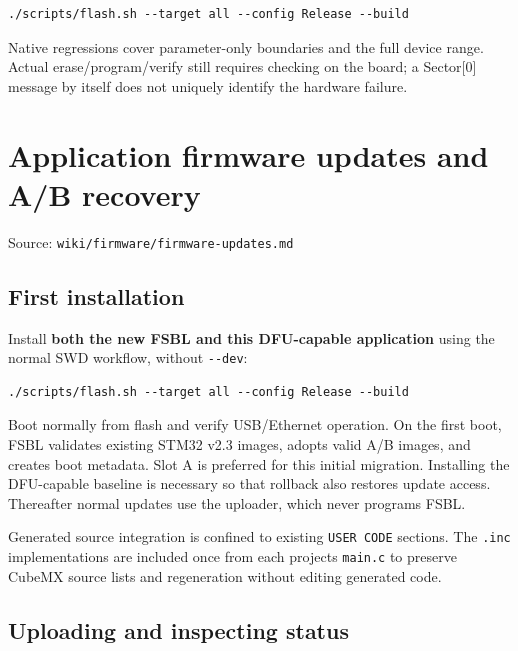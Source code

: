 \documentclass[10pt,a4paper,oneside]{report}
\begin{document}
\begin{verbatim}
./scripts/flash.sh --target all --config Release --build
\end{verbatim}

Native regressions cover parameter-only boundaries and the full device range. Actual erase/program/verify still requires checking on the board; a Sector{[}0{]} message by itself does not uniquely identify the hardware failure.

\chapter{Application firmware updates and A/B recovery}\label{wiki-firmware-firmware-updates--application-firmware-updates-and-ab-recovery}

{\small\color{MGSMuted}Source: \nolinkurl{wiki/firmware/firmware-updates.md}\par}\medskip

\section{First installation}\label{wiki-firmware-firmware-updates--first-installation}

Install \textbf{both the new FSBL and this DFU-capable application} using the normal SWD workflow, without \texttt{-\allowbreak{}-\allowbreak{}dev}:

\begin{verbatim}
./scripts/flash.sh --target all --config Release --build
\end{verbatim}

Boot normally from flash and verify USB/Ethernet operation. On the first boot, FSBL validates existing STM32 v2.3 images, adopts valid A/B images, and creates boot metadata. Slot A is preferred for this initial migration. Installing the DFU-capable baseline is necessary so that rollback also restores update access. Thereafter normal updates use the uploader, which never programs FSBL.

Generated source integration is confined to existing \texttt{USER CODE} sections. The \texttt{.\allowbreak{}inc} implementations are included once from each project\textquotesingle s \texttt{main.\allowbreak{}c} to preserve CubeMX source lists and regeneration without editing generated code.

\section{Uploading and inspecting status}\label{wiki-firmware-firmware-updates--uploading-and-inspecting-status}
\end{document}
